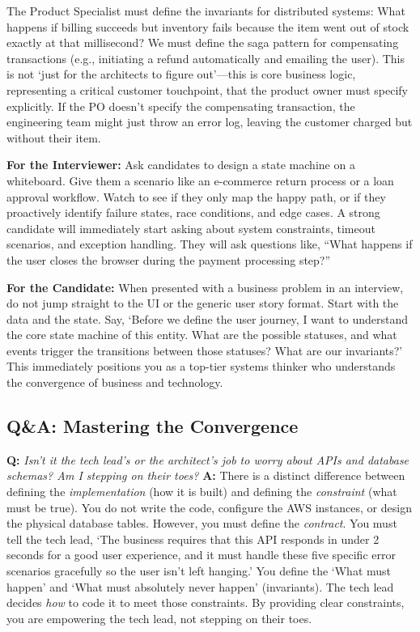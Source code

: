 \documentclass[
  11pt,
  openany,
  oneside]{book}
\renewenvironment{quote}{\begin{customquote}}{\end{customquote}}
\begin{document}
The Product Specialist must define the invariants for distributed
systems: What happens if billing succeeds but inventory fails because
the item went out of stock exactly at that millisecond? We must define
the saga pattern for compensating transactions (e.g., initiating a
refund automatically and emailing the user). This is not `just for the
architects to figure out'---this is core business logic, representing a
critical customer touchpoint, that the product owner must specify
explicitly. If the PO doesn't specify the compensating transaction, the
engineering team might just throw an error log, leaving the customer
charged but without their item.

\begin{quote}
\textbf{For the Interviewer:} Ask candidates to design a state machine
on a whiteboard. Give them a scenario like an e-commerce return process
or a loan approval workflow. Watch to see if they only map the happy
path, or if they proactively identify failure states, race conditions,
and edge cases. A strong candidate will immediately start asking about
system constraints, timeout scenarios, and exception handling. They will
ask questions like, ``What happens if the user closes the browser during
the payment processing step?''
\end{quote}

\begin{quote}
\textbf{For the Candidate:} When presented with a business problem in an
interview, do not jump straight to the UI or the generic user story
format. Start with the data and the state. Say, `Before we define the
user journey, I want to understand the core state machine of this
entity. What are the possible statuses, and what events trigger the
transitions between those statuses? What are our invariants?' This
immediately positions you as a top-tier systems thinker who understands
the convergence of business and technology.
\end{quote}

\subsection{Q\&A: Mastering the
Convergence}\label{qa-mastering-the-convergence}

\textbf{Q:} \emph{Isn't it the tech lead's or the architect's job to
worry about APIs and database schemas? Am I stepping on their toes?}
\textbf{A:} There is a distinct difference between defining the
\emph{implementation} (how it is built) and defining the
\emph{constraint} (what must be true). You do not write the code,
configure the AWS instances, or design the physical database tables.
However, you must define the \emph{contract}. You must tell the tech
lead, `The business requires that this API responds in under 2 seconds
for a good user experience, and it must handle these five specific error
scenarios gracefully so the user isn't left hanging.' You define the
`What must happen' and `What must absolutely never happen' (invariants).
The tech lead decides \emph{how} to code it to meet those constraints.
By providing clear constraints, you are empowering the tech lead, not
stepping on their toes.
\end{document}
